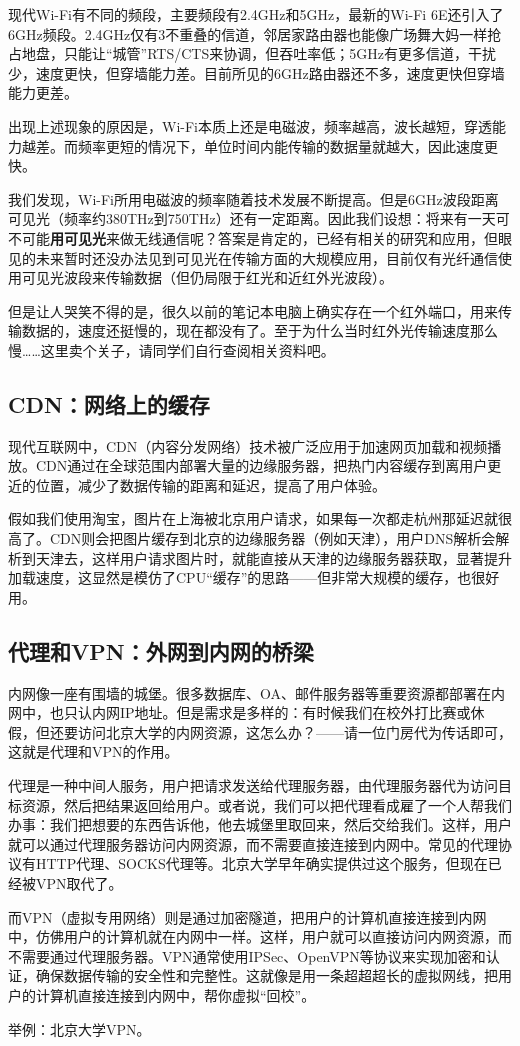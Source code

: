 现代Wi-Fi有不同的频段，主要频段有2.4GHz和5GHz，最新的Wi-Fi 6E还引入了6GHz频段。2.4GHz仅有3不重叠的信道，邻居家路由器也能像广场舞大妈一样抢占地盘，只能让“城管”RTS/CTS来协调，但吞吐率低；5GHz有更多信道，干扰少，速度更快，但穿墙能力差。目前所见的6GHz路由器还不多，速度更快但穿墙能力更差。

\begin{tip}
  出现上述现象的原因是，Wi-Fi本质上还是电磁波，频率越高，波长越短，穿透能力越差。而频率更短的情况下，单位时间内能传输的数据量就越大，因此速度更快。

  我们发现，Wi-Fi所用电磁波的频率随着技术发展不断提高。但是6GHz波段距离可见光（频率约380THz到750THz）还有一定距离。因此我们设想：将来有一天可不可能\textbf{用可见光}来做无线通信呢？答案是肯定的，已经有相关的研究和应用，但眼见的未来暂时还没办法见到可见光在传输方面的大规模应用，目前仅有光纤通信使用可见光波段来传输数据（但仍局限于红光和近红外光波段）。

  但是让人哭笑不得的是，很久以前的笔记本电脑上确实存在一个红外端口，用来传输数据的，速度还挺慢的，现在都没有了。至于为什么当时红外光传输速度那么慢……这里卖个关子，请同学们自行查阅相关资料吧。
\end{tip}

\subsection{CDN：网络上的缓存}

现代互联网中，CDN（内容分发网络）技术被广泛应用于加速网页加载和视频播放。CDN通过在全球范围内部署大量的边缘服务器，把热门内容缓存到离用户更近的位置，减少了数据传输的距离和延迟，提高了用户体验。

假如我们使用淘宝，图片在上海被北京用户请求，如果每一次都走杭州那延迟就很高了。CDN则会把图片缓存到北京的边缘服务器（例如天津），用户DNS解析会解析到天津去，这样用户请求图片时，就能直接从天津的边缘服务器获取，显著提升加载速度，这显然是模仿了CPU“缓存”的思路——但非常大规模的缓存，也很好用。

\subsection{代理和VPN：外网到内网的桥梁}

内网像一座有围墙的城堡。很多数据库、OA、邮件服务器等重要资源都部署在内网中，也只认内网IP地址。但是需求是多样的：有时候我们在校外打比赛或休假，但还要访问北京大学的内网资源，这怎么办？——请一位门房代为传话即可，这就是代理和VPN的作用。

代理是一种中间人服务，用户把请求发送给代理服务器，由代理服务器代为访问目标资源，然后把结果返回给用户。或者说，我们可以把代理看成雇了一个人帮我们办事：我们把想要的东西告诉他，他去城堡里取回来，然后交给我们。这样，用户就可以通过代理服务器访问内网资源，而不需要直接连接到内网中。常见的代理协议有HTTP代理、SOCKS代理等。北京大学早年确实提供过这个服务，但现在已经被VPN取代了。

而VPN（虚拟专用网络）则是通过加密隧道，把用户的计算机直接连接到内网中，仿佛用户的计算机就在内网中一样。这样，用户就可以直接访问内网资源，而不需要通过代理服务器。VPN通常使用IPSec、OpenVPN等协议来实现加密和认证，确保数据传输的安全性和完整性。这就像是用一条超超超长的虚拟网线，把用户的计算机直接连接到内网中，帮你虚拟“回校”。

举例：北京大学VPN。